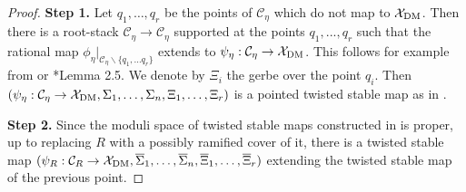 \documentclass{amsart}
\newcommand{\sC}{\mathscr{C}}
\newcommand{\cC}{\mathcal{C}}
\newcommand{\cX}{\mathcal{X}}
\newcommand{\dm}{{\rm DM}}
\theoremstyle{definition}
\theoremstyle{definition}
\begin{document}
{\begin{proof}
    \textbf{Step 1.} Let $q_1,\ldots ,q_r$ be the points of $\sC_\eta$ which do not map to $\cX_{\dm}$. Then there is a root-stack $\cC_\eta\to \sC_\eta$ supported at the points $q_1,...,q_r$ such that the rational map $\phi_\eta|_{\sC_\eta\smallsetminus \{q_1,\ldots q_r\}}$ extends to $\psi_\eta:\cC_\eta\to \cX_{\dm}$.
    This follows for example from \cite{bresciani2022arithmetic} or \cite{orbifold_qmap_theory}*{Lemma 2.5}. We denote by $\Xi_i$ the gerbe over the point $q_i$. Then $(\psi_\eta:\cC_\eta\to \cX_{\dm}, \Sigma_1,\ldots,\Sigma_n,\Xi_1,\ldots,\Xi_r)$ is a pointed twisted stable map as in \cite{AV_compactifying}.

    \textbf{Step 2.} Since the moduli space of twisted stable maps constructed in \cite{AV_compactifying} is proper, up to replacing $R$ with a possibly ramified cover of it, there is a twisted stable map $(\psi_R:\cC_R\to \cX_{\dm}, \overline{\Sigma}_1,\ldots,\overline{\Sigma}_n,\overline{\Xi}_1,\ldots,\overline{\Xi}_r)$ extending the twisted stable map of the previous point.


\end{proof}}
\end{document}
